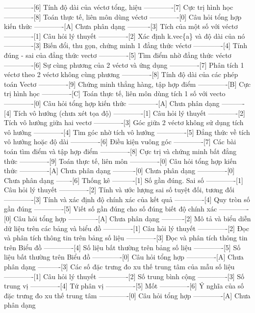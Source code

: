 -------------[6] Tính độ dài của véctơ tổng, hiệu
-------------[7] Cực trị hình học
-------------[8] Toán thực tế, liên môn dùng véctơ
-------------[0] Câu hỏi tổng hợp kiến thức
-------------[A] Chưa phân dạng
----------[3] Tích của một số với véctơ
-------------[1] Câu hỏi lý thuyết
-------------[2] Xác định k.vec\{a\} và độ dài của nó
-------------[3] Biến đổi, thu gọn, chứng minh 1 đẳng thức véctơ
-------------[4] Tính đúng - sai của đẳng thức vectơ
-------------[5] Tìm điểm nhờ đẳng thức véctơ
-------------[6] Sự cùng phương của 2 véctơ và ứng dụng
-------------[7] Phân tích 1 véctơ theo 2 véctơ không cùng phương
-------------[8] Tính độ dài của các phép toán Vectơ
-------------[9] Chứng minh thẳng hàng, tập hợp điểm
-------------[B] Cực trị hình học
-------------[C] Toán thực tế, liên môn dùng tích 1 số với vecto
-------------[0] Câu hỏi tổng hợp kiến thức
-------------[A] Chưa phân dạng
----------[4] Tích vô hướng (chưa xét tọa độ)
-------------[1] Câu hỏi lý thuyết
-------------[2] Tích vô hướng giữa hai vectơ
-------------[3] Góc giữa 2 véctơ không sử dụng tích vô hướng
-------------[4] Tìm góc nhờ tích vô hướng
-------------[5] Đẳng thức về tích vô hướng hoặc độ dài
-------------[6] Điều kiện vuông góc
-------------[7] Các bài toán tìm điểm và tập hợp điểm
-------------[8] Cực trị và chứng minh bất đẳng thức
-------------[9] Toán thực tế, liên môn
-------------[0] Câu hỏi tổng hợp kiến thức
-------------[A] Chưa phân dạng
----------[0] Chưa phân dạng
-------------[0] Chưa phân dạng
-------[6] Thống kê
----------[1] Số gần đúng. Sai số
-------------[1] Câu hỏi lý thuyết
-------------[2] Tính và ước lượng sai số tuyệt đối, tương đối
-------------[3] Tính và xác định độ chính xác của kết quả
-------------[4] Quy tròn số gần đúng
-------------[5] Viết số gần đúng cho số đúng biết độ chính xác
-------------[0] Câu hỏi tổng hợp
-------------[A] Chưa phân dạng
----------[2] Mô tả và biểu diễn dữ liệu trên các bảng và biểu đồ
-------------[1] Câu hỏi lý thuyết
-------------[2] Đọc và phân tích thông tin trên bảng số liệu
-------------[3] Đọc và phân tích thông tin trên Biểu đồ
-------------[4] Số liệu bất thường trên bảng số liệu
-------------[5] Số liệu bất thường trên Biểu đồ
-------------[0] Câu hỏi tổng hợp
-------------[A] Chưa phân dạng
----------[3] Các số đặc trưng đo xu thế trung tâm của mẫu số liệu
-------------[1] Câu hỏi lý thuyết
-------------[2] Số trung bình cộng
-------------[3] Số trung vị
-------------[4] Tứ phân vị
-------------[5] Mốt
-------------[6] Ý nghĩa của số đặc trưng đo xu thế trung tâm
-------------[0] Câu hỏi tổng hợp
-------------[A] Chưa phân dạng
